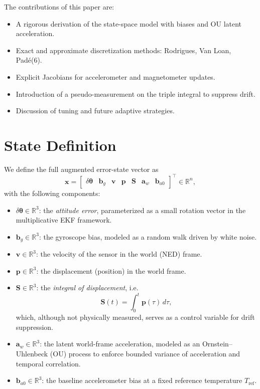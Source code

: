 \documentclass[10pt]{extarticle}
\begin{document}
The contributions of this paper are:
\begin{itemize}
\item A rigorous derivation of the state-space model with biases and OU latent acceleration.
\item Exact and approximate discretization methods: Rodrigues, Van Loan, Pad\'e(6).
\item Explicit Jacobians for accelerometer and magnetometer updates.
\item Introduction of a pseudo-measurement on the triple integral to suppress drift.
\item Discussion of tuning and future adaptive strategies.
\end{itemize}

\section{State Definition}

We define the full augmented error-state vector as
\begin{equation}
\bm{x} =
\begin{bmatrix}
\delta\bm\theta & \bm b_g & \bm v & \bm p & \bm S & \bm a_w & \bm b_{a0}
\end{bmatrix}^\top \in \mathbb{R}^n,
\label{eq:state_vector}
\end{equation}
with the following components:
\begin{itemize}
\item $\delta\bm\theta \in \mathbb{R}^3$: the \emph{attitude error}, parameterized as a small rotation vector in the multiplicative EKF framework.
\item $\bm b_g \in \mathbb{R}^3$: the gyroscope bias, modeled as a random walk driven by white noise.
\item $\bm v \in \mathbb{R}^3$: the velocity of the sensor in the world (NED) frame.
\item $\bm p \in \mathbb{R}^3$: the displacement (position) in the world frame.
\item $\bm S \in \mathbb{R}^3$: the \emph{integral of displacement}, i.e.
  \[
  \bm S(t) = \int_0^t \bm p(\tau)\, d\tau,
  \]
  which, although not physically measured, serves as a control variable for drift suppression.
\item $\bm a_w \in \mathbb{R}^3$: the latent world-frame acceleration, modeled as an Ornstein--Uhlenbeck (OU) process to enforce bounded variance of acceleration and temporal correlation.
\item $\bm b_{a0} \in \mathbb{R}^3$: the baseline accelerometer bias at a fixed reference temperature $T_\text{ref}$.
\end{itemize}
\end{document}
